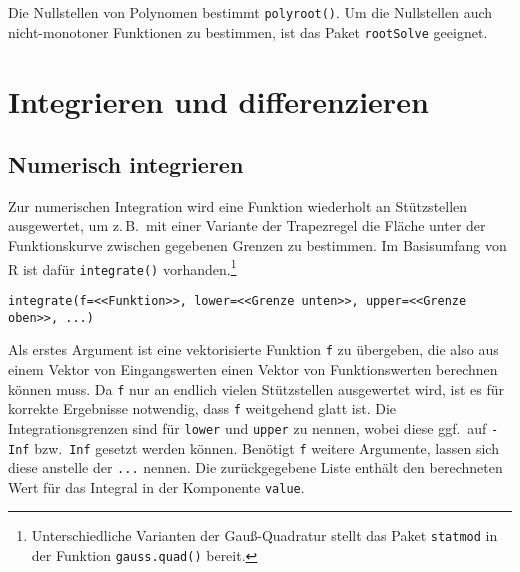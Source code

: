 Die Nullstellen von Polynomen bestimmt \lstinline!polyroot()!. Um die Nullstellen auch nicht-monotoner Funktionen zu bestimmen, ist das Paket \lstinline!rootSolve! \cite{Soetaert2009} geeignet.

\section{Integrieren und differenzieren}
\label{sec:intDiff}

\subsection{Numerisch integrieren}
\label{sec:integrate}

Zur numerischen Integration wird eine Funktion wiederholt an Stützstellen ausgewertet, um z.\,B.\ mit einer Variante der Trapezregel die Fläche unter der Funktionskurve zwischen gegebenen Grenzen zu bestimmen. Im Basisumfang von R ist dafür \lstinline!integrate()! vorhanden.\footnote{Unterschiedliche Varianten der Gauß-Quadratur stellt das Paket \lstinline!statmod! \cite{Smyth2015} in der Funktion \lstinline!gauss.quad()! bereit.}
\begin{lstlisting}
integrate(f=<<Funktion>>, lower=<<Grenze unten>>, upper=<<Grenze oben>>, ...)
\end{lstlisting}

Als erstes Argument ist eine vektorisierte Funktion \lstinline!f! zu übergeben, die also aus einem Vektor von Eingangswerten einen Vektor von Funktionswerten berechnen können muss. Da \lstinline!f! nur an endlich vielen Stützstellen ausgewertet wird, ist es für korrekte Ergebnisse notwendig, dass \lstinline!f! weitgehend glatt ist. Die Integrationsgrenzen sind für \lstinline!lower! und \lstinline!upper! zu nennen, wobei diese ggf.\ auf \lstinline!-Inf! bzw.\ \lstinline!Inf! gesetzt werden können. Benötigt \lstinline!f! weitere Argumente, lassen sich diese anstelle der \lstinline!...! nennen. Die zurückgegebene Liste enthält den berechneten Wert für das Integral in der Komponente \lstinline!value!.

